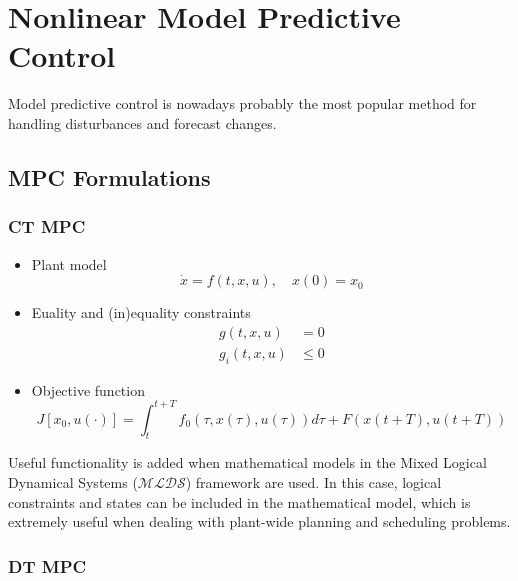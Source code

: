 
\section{Nonlinear Model Predictive Control}
Model predictive control is nowadays probably the most popular method for handling disturbances and forecast changes.
\subsection{MPC Formulations}
\subsubsection{CT MPC}

\begin{itemize}
    \item Plant model
          \begin{equation*}
              \dot{x} = f(t, x, u), \quad x(0) = x_0
          \end{equation*}
    \item Euality and (in)equality constraints
          \begin{align*}
              g(t, x, u)   & = 0    \\
              g_i(t, x, u) & \leq 0
          \end{align*}
    \item Objective function
              {\small
                  \begin{equation*}
                      J[x_0, u(\cdot)] = \int_{t}^{t+T} f_0(\tau, x(\tau), u(\tau)) d\tau + F(x(t+T), u(t+T))
                  \end{equation*}
              }
\end{itemize}
\newpar{}

Useful functionality is added when mathematical models in the Mixed Logical Dynamical Systems ($\mathcal{MLDS}$) framework are used. In this case, logical constraints and states can be included in the mathematical model, which is extremely useful when dealing with plant-wide planning and scheduling problems.

\subsubsection{DT MPC}

